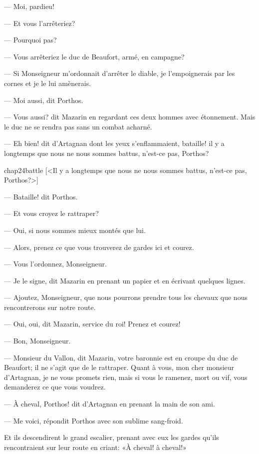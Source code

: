 — Moi, pardieu!

— Et vous l'arrêteriez?

— Pourquoi pas?

— Vous arrêteriez le duc de Beaufort, armé, en campagne?

— Si Monseigneur m'ordonnait d'arrêter le diable, je l'empoignerais par les cornes et je le lui amènerais.

— Moi aussi, dit Porthos.

— Vous aussi? dit Mazarin en regardant ces deux hommes avec étonnement. Mais le duc ne se rendra pas sans un combat acharné.

— Eh bien! dit d'Artagnan dont les yeux s'enflammaient, bataille! il y a longtemps que nous ne nous sommes battus, n'est-ce pas, Porthos?

\begin{bwbigpic}
	[\basicscale] 
	{chap24battle}
	[<Il y a longtemps que nous ne nous sommes battus, n'est-ce pas, Porthos?>]
\end{bwbigpic}

— Bataille! dit Porthos.

— Et vous croyez le rattraper?

— Oui, si nous sommes mieux montés que lui.

— Alors, prenez ce que vous trouverez de gardes ici et courez.

— Vous l'ordonnez, Monseigneur.

— Je le signe, dit Mazarin en prenant un papier et en écrivant quelques lignes.

— Ajoutez, Monseigneur, que nous pourrons prendre tous les chevaux que nous rencontrerons sur notre route.

— Oui, oui, dit Mazarin, service du roi! Prenez et courez!

— Bon, Monseigneur.

— Monsieur du Vallon, dit Mazarin, votre baronnie est en croupe du duc de Beaufort; il ne s'agit que de le rattraper. Quant à vous, mon cher monsieur d'Artagnan, je ne vous promets rien, mais si vous le ramenez, mort ou vif, vous demanderez ce que vous voudrez.

— À cheval, Porthos! dit d'Artagnan en prenant la main de son ami.

— Me voici, répondit Porthos avec son sublime sang-froid.

Et ils descendirent le grand escalier, prenant avec eux les gardes qu'ils rencontraient sur leur route en criant: «À cheval! à cheval!»

